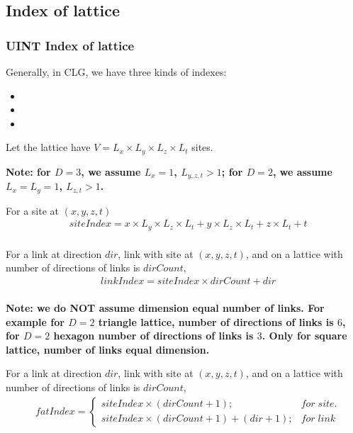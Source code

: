 \subsection{\label{index}Index of lattice}

\subsubsection{\label{index}UINT Index of lattice}

Generally, in CLG, we have three kinds of indexes:

\begin{itemize}
\item {}
\item {}
\item {}
\end{itemize}

Let the lattice have $V = L_x\times L_y\times L_z\times L_t$ sites.

\textcolor[rgb]{1,0,0}{\bf Note: for $D=3$, we assume $L_x=1$, $L_{y,z,t}>1$; for $D=2$, we assume $L_x=L_y=1$, $L_{z,t}>1$. }

For a site at $(x,y,z,t)$
\begin{equation}
\begin{split}
&siteIndex=x\times L_y\times L_z\times L_t+y\times L_z\times L_t+z\times L_t+t\\
\end{split}
\end{equation}

For a link at direction $dir$, link with site at $(x,y,z,t)$, and on a lattice with number of directions of links is $dirCount$,
\begin{equation}
\begin{split}
&linkIndex=siteIndex\times dirCount+dir\\
\end{split}
\end{equation}

\textcolor[rgb]{1,0,0}{\bf Note: we do NOT assume dimension equal number of links. For example for $D=2$ triangle lattice, number of directions of links is $6$, for $D=2$ hexagon number of directions of links is $3$. Only for square lattice, number of links equal dimension.}

For a link at direction $dir$, link with site at $(x,y,z,t)$, and on a lattice with number of directions of links is $dirCount$,
\begin{equation}
\begin{split}
&fatIndex=\left\{\begin{array}{cc}siteIndex\times (dirCount+1);&for\;site.\\ siteIndex\times (dirCount+1)+(dir+1);&for\;link\end{array}\right.\\
\end{split}
\end{equation}

